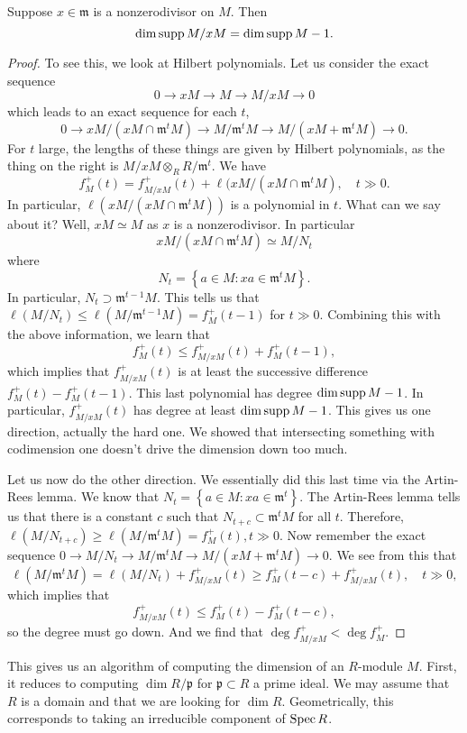 \begin{proposition} 
Suppose $x \in \mathfrak{m}$ is a nonzerodivisor on $M$. Then 
\[ \dim \operatorname{supp} M/xM = \dim \operatorname{supp} M - 1.  \]
\end{proposition} 
\begin{proof} 
To see this, we look at Hilbert polynomials. Let us consider the exact sequence
\[ 0 \to xM \to M \to M/xM \to 0  \]
which leads to an exact sequence for each $t$,
\[ 0 \to xM/(xM \cap \mathfrak{m}^t M) \to M/\mathfrak{m}^t M \to M/(xM  +
\mathfrak{m}^t M) \to 0 . \]
For $t$ large, the lengths of these things are given by Hilbert polynomials,
as the thing on the right is $M/xM \otimes_R R/\mathfrak{m}^t$. 
We have
\[ f_M^+(t) = f_{M/xM}^+(t) + \ell(xM/ (x M \cap \mathfrak{m}^t M), \quad t
\gg 0.  \]
In particular, $\ell( xM/ (xM \cap \mathfrak{m}^t M))$ is a polynomial in $t$.
What can we say about it? Well, $xM \simeq M$ as $x$ is a nonzerodivisor. In
particular
\[ xM / (xM \cap \mathfrak{m}^t M) \simeq M/N_t  \]
where
\[ N_t = \left\{a \in M: xa \in \mathfrak{m}^t M\right\} . \]
In particular, $N_t \supset \mathfrak{m}^{t-1} M$. This tells us that
$\ell(M/N_t) \leq \ell(M/\mathfrak{m}^{t-1} M) = f_M^+(t-1)$ for $t \gg 0$.
Combining this with the above information, we learn that
\[ f_M^+(t) \leq f_{M/xM}^+(t) + f_M^+(t-1),   \]
which implies that $f_{M/xM}^+(t)$ is at least the successive difference
$f_M^+(t) - f_M^+(t-1)$. This last polynomial has degree $\dim \operatorname{supp} M -1$. In
particular, $f_{M/xM}^+(t)$ has degree at least $\dim \operatorname{supp} M -1 $. This gives
us one direction, actually the hard one. We showed that intersecting something with codimension one
doesn't drive the dimension down too much. 

Let us now do the other direction. We essentially did this last time via the
Artin-Rees lemma. We know that $N_t = \left\{a \in M: xa \in
\mathfrak{m}^t\right\}$. The Artin-Rees lemma tells us that there is a constant
$c$ such that $N_{t+c} \subset \mathfrak{m}^t M$ for all $t$. Therefore,
$\ell(M/N_{t+c}) \geq \ell(M/\mathfrak{m}^t M) = f_M^+(t), t \gg 0$. Now
remember the exact sequence $0 \to M/N_t \to M/\mathfrak{m}^t M \to M/(xM +
\mathfrak{m}^t M) \to 0$. We see from this that
\[ \ell(M/ \mathfrak{m}^t M) = \ell(M/N_t) + f_{M/xM}^+(t) \geq f_M^+(t-c) +
f_{M/xM}^+(t), \quad t \gg 0,  \]
which implies that
\[ f_{M/xM}^+(t) \leq f_M^+(t) - f_M^+(t-c),  \]
so the degree must go down. And we find that $\deg f_{M/xM}^+ < \deg f_{M}^+$.
\end{proof} 

This gives us an algorithm of computing the dimension of an $R$-module $M$. 
First, it reduces to computing $\dim R/\mathfrak{p}$ for $\mathfrak{p} \subset
R$ a prime ideal. We may assume that $R$ is a domain and that we are looking
for $\dim R$. Geometrically, this
corresponds to taking an irreducible component of $\operatorname{Spec} R$.

